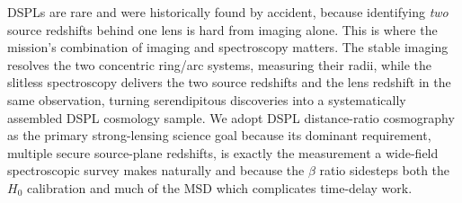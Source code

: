 \documentclass[10pt,onecolumn]{article}
\begin{document}
DSPLs are rare and were historically found by accident, because identifying \emph{two} source redshifts behind one lens is hard from imaging alone. This is where the mission's combination of imaging and spectroscopy matters. The stable imaging resolves the two concentric ring/arc systems, measuring their radii, while the slitless spectroscopy delivers the two source redshifts and the lens redshift in the same observation, turning serendipitous discoveries into a systematically assembled DSPL cosmology sample. We adopt DSPL distance-ratio cosmography as the primary strong-lensing science goal because its dominant requirement, multiple secure source-plane redshifts, is exactly the measurement a wide-field spectroscopic survey makes naturally and because the $\beta$ ratio sidesteps both the $H_0$ calibration and much of the MSD which complicates time-delay work.
\end{document}
